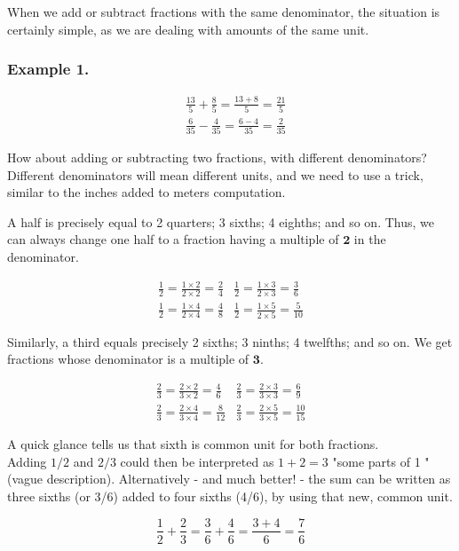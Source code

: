 \documentclass{ximera}
\begin{document}
When we add or subtract fractions with the same denominator, the situation is certainly simple, as we are dealing with amounts of the same unit.

\subsubsection*{Example 1.}
$$\begin{aligned}
& \frac{13}{5}+\frac{8}{5}=\frac{13+8}{5}=\frac{21}{5} \\
& \frac{6}{35}-\frac{4}{35}=\frac{6-4}{35}=\frac{2}{35}
\end{aligned}$$

How about adding or subtracting two fractions, with different denominators? Different denominators will mean different units, and we need to use a trick, similar to the inches added to meters computation.

A half is precisely equal to 2 quarters; 3 sixths; 4 eighths; and so on. Thus, we can always change one half to a fraction having a multiple of $\mathbf{2}$ in the denominator.

$$\begin{array}{ll}
\frac{1}{2}=\frac{1 \times 2}{2 \times 2}=\frac{2}{4} & \frac{1}{2}=\frac{1 \times 3}{2 \times 3}=\frac{3}{6} \\
\frac{1}{2}=\frac{1 \times 4}{2 \times 4}=\frac{4}{8} & \frac{1}{2}=\frac{1 \times 5}{2 \times 5}=\frac{5}{10}
\end{array}$$

Similarly, a third equals precisely 2 sixths; 3 ninths; 4 twelfths; and so on. We get fractions whose denominator is a multiple of $\mathbf{3}$.

$$\begin{array}{ll}
\frac{2}{3}=\frac{2 \times 2}{3 \times 2}=\frac{4}{6} & \frac{2}{3}=\frac{2 \times 3}{3 \times 3}=\frac{6}{9} \\
\frac{2}{3}=\frac{2 \times 4}{3 \times 4}=\frac{8}{12} & \frac{2}{3}=\frac{2 \times 5}{3 \times 5}=\frac{10}{15}
\end{array}$$

A quick glance tells us that sixth is common unit for both fractions.\\
Adding $1 / 2$ and $2 / 3$ could then be interpreted as $1+2=3$ "some parts of 1 " (vague description). Alternatively - and much better! - the sum can be written as three sixths (or 3/6) added to four sixths (4/6), by using that new, common unit.

$$\frac{1}{2}+\frac{2}{3}=\frac{3}{6}+\frac{4}{6}=\frac{3+4}{6}=\frac{7}{6}$$
\end{document}
